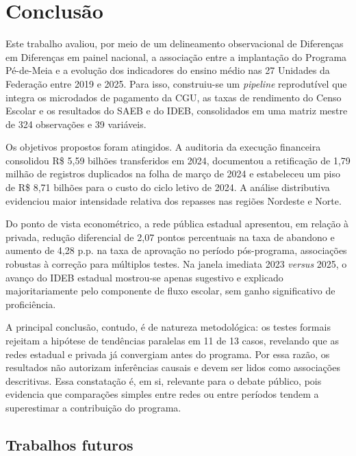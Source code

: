 
\chapter{Conclusão}
\label{chap_conclusao}

Este trabalho avaliou, por meio de um delineamento observacional de Diferenças em Diferenças em painel nacional, a associação entre a implantação do Programa Pé-de-Meia e a evolução dos indicadores do ensino médio nas 27 Unidades da Federação entre 2019 e 2025.
Para isso, construiu-se um \textit{pipeline} reprodutível que integra os microdados de pagamento da CGU, as taxas de rendimento do Censo Escolar e os resultados do SAEB e do IDEB, consolidados em uma matriz mestre de 324 observações e 39 variáveis.

Os objetivos propostos foram atingidos.
A auditoria da execução financeira consolidou R\$ 5,59 bilhões transferidos em 2024, documentou a retificação de 1,79 milhão de registros duplicados na folha de março de 2024 e estabeleceu um piso de R\$ 8,71 bilhões para o custo do ciclo letivo de 2024.
A análise distributiva evidenciou maior intensidade relativa dos repasses nas regiões Nordeste e Norte.

Do ponto de vista econométrico, a rede pública estadual apresentou, em relação à privada, redução diferencial de 2,07 pontos percentuais na taxa de abandono e aumento de 4,28 p.p. na taxa de aprovação no período pós-programa, associações robustas à correção para múltiplos testes.
Na janela imediata 2023 \textit{versus} 2025, o avanço do IDEB estadual mostrou-se apenas sugestivo e explicado majoritariamente pelo componente de fluxo escolar, sem ganho significativo de proficiência.

A principal conclusão, contudo, é de natureza metodológica: os testes formais rejeitam a hipótese de tendências paralelas em 11 de 13 casos, revelando que as redes estadual e privada já convergiam antes do programa.
Por essa razão, os resultados não autorizam inferências causais e devem ser lidos como associações descritivas.
Essa constatação é, em si, relevante para o debate público, pois evidencia que comparações simples entre redes ou entre períodos tendem a superestimar a contribuição do programa.

\section{Trabalhos futuros}
\label{sec_trabalhos_futuros}


